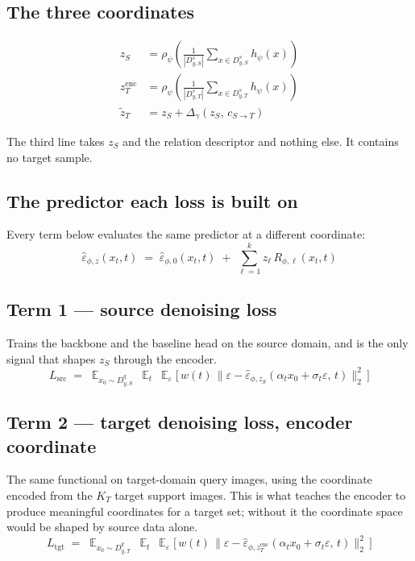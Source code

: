 \documentclass[11pt]{article}
\newcommand{\epshat}{\hat{\varepsilon}}
\newcommand{\zS}{z_{S}}
\newcommand{\zencT}{z^{\mathrm{enc}}_{T}}
\newcommand{\ztilT}{\tilde{z}_{T}}
\newcommand{\Dss}{D^{s}_{y,S}}
\newcommand{\Dqs}{D^{q}_{y,S}}
\newcommand{\Dst}{D^{s}_{y,T}}
\newcommand{\Dqt}{D^{q}_{y,T}}
\newcommand{\KT}{K_{T}}
\begin{document}
\subsection{The three coordinates}

\begin{align}
\zS      &= \rho_\psi\!\left( \frac{1}{|\Dss|}\sum_{x\in \Dss} h_\psi(x) \right) \\
\zencT   &= \rho_\psi\!\left( \frac{1}{|\Dst|}\sum_{x\in \Dst} h_\psi(x) \right) \\
\ztilT   &= \zS + \Delta_\gamma\!\left( \zS,\, c_{S\to T} \right)
\end{align}

The third line takes $\zS$ and the relation descriptor and nothing else. It contains no target
sample.

\subsection{The predictor each loss is built on}

Every term below evaluates the same predictor at a different coordinate:
\begin{equation}
\epshat_{\phi,z}(x_t,t) \;=\; \epshat_{\phi,0}(x_t,t)
  \;+\; \sum_{\ell=1}^{k} z_\ell \, R_{\phi,\ell}(x_t,t)
\label{eq:pred}
\end{equation}

\subsection{Term 1 --- source denoising loss}

Trains the backbone and the baseline head on the source domain, and is the only signal that shapes
$\zS$ through the encoder.
\begin{equation}
L_{\mathrm{src}} \;=\;
\mathop{\mathbb{E}}_{x_0\sim \Dqs}\ \mathop{\mathbb{E}}_{t}\ \mathop{\mathbb{E}}_{\varepsilon}
\Big[\, w(t)\, \big\| \varepsilon - \epshat_{\phi,\zS}(\alpha_t x_0+\sigma_t\varepsilon,\, t) \big\|_2^2 \,\Big]
\end{equation}

\subsection{Term 2 --- target denoising loss, encoder coordinate}

The same functional on target-domain query images, using the coordinate encoded from the $\KT$
target support images. This is what teaches the encoder to produce meaningful coordinates for a
target set; without it the coordinate space would be shaped by source data alone.
\begin{equation}
L_{\mathrm{tgt}} \;=\;
\mathop{\mathbb{E}}_{x_0\sim \Dqt}\ \mathop{\mathbb{E}}_{t}\ \mathop{\mathbb{E}}_{\varepsilon}
\Big[\, w(t)\, \big\| \varepsilon - \epshat_{\phi,\zencT}(\alpha_t x_0+\sigma_t\varepsilon,\, t) \big\|_2^2 \,\Big]
\end{equation}
\end{document}
